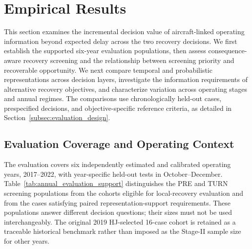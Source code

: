 
\section{Empirical Results}
\label{sec:results}

This section examines the incremental decision value of aircraft-linked operating information beyond expected delay across the two recovery decisions. We first establish the supported six-year evaluation populations, then assess consequence-aware recovery screening and the relationship between screening priority and recoverable opportunity. We next compare temporal and probabilistic representations across decision layers, investigate the information requirements of alternative recovery objectives, and characterize variation across operating stages and annual regimes. The comparisons use chronologically held-out cases, prespecified decisions, and objective-specific reference criteria, as detailed in Section~\ref{subsec:evaluation_design}.

\subsection{Evaluation Coverage and Operating Context}
\label{subsec:results_coverage}

The evaluation covers six independently estimated and calibrated operating years, 2017--2022, with year-specific held-out tests in October--December. Table~\ref{tab:annual_evaluation_support} distinguishes the PRE and TURN screening populations from the cohorts eligible for local-recovery evaluation and from the cases satisfying paired representation-support requirements. These populations answer different decision questions; their sizes must not be used interchangeably. The original 2019 HJ-selected 16-case cohort is retained as a traceable historical benchmark rather than imposed as the Stage-II sample size for other years.

